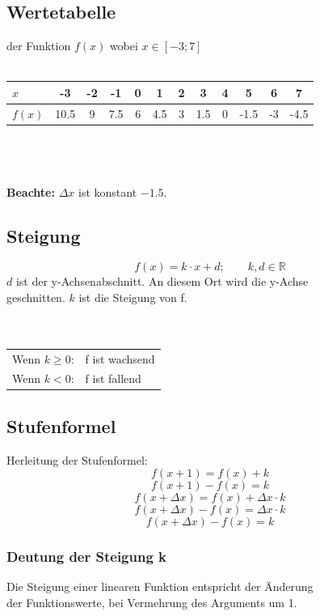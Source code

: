 \documentclass[12pt,a4paper]{scrbook}
\begin{document}
\subsection{Wertetabelle} der Funktion $f(x)$ wobei $x \in [-3; 7]$\\\\
\begin{tabular}{l||c|c|c|c|c|c|c|c|c|c|c}
$x$ & -3 & -2 & -1 & 0 & 1 & 2 & 3 & 4 & 5 & 6 & 7\\
\hline
$f(x)$ & 10.5 & 9 & 7.5 & 6 & 4.5 & 3 & 1.5 & 0 & -1.5 & -3 & -4.5\\
\end{tabular}\\\\\\
\textbf{Beachte:} $\Delta x$ ist konstant $-1.5$.\\

\subsection{Steigung}
\[f(x) = k\cdot x + d; \quad\quad k,d \in \mathbb{R}\]
$d$ ist der y-Achsenabschnitt. An diesem Ort wird die y-Achse\\
geschnitten. $k$ ist die Steigung von f.\\\\\\
\begin{tabular}{ll}
Wenn $k \geq 0$: & f ist wachsend\\
Wenn $k < 0$: & f ist fallend\\
\end{tabular}

\subsection{Stufenformel}
Herleitung der Stufenformel:
\[f(x+1) = f(x) + k\]
\[f(x+1) - f(x) = k\]
\[f(x+\Delta x) = f(x) + \Delta x \cdot k\]
\[f(x+\Delta x) - f(x) = \Delta x \cdot k\]
\[f(x+\Delta x) - f(x) = k\]

\begin{center}
\fbox{\parbox{4cm}{\[\frac{\Delta y}{\Delta x} = k\]}}
\end{center}


\subsubsection{Deutung der Steigung k}
Die Steigung einer linearen Funktion entspricht der Änderung\\
der Funktionswerte, bei Vermehrung des Arguments um 1.
\end{document}
